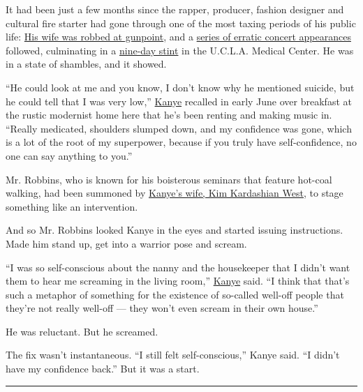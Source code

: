 It had been just a few months since the rapper, producer, fashion
designer and cultural fire starter had gone through one of the most
taxing periods of his public life:
\href{https://www.nytimes3xbfgragh.onion/2016/10/04/world/europe/kim-kardashian-robbed.html}{His
wife was robbed at gunpoint}, and a
\href{https://www.nytimes3xbfgragh.onion/2016/11/21/arts/music/kanye-west-beyonce-donald-trump-speech.html}{series
of erratic concert appearances} followed, culminating in a
\href{https://www.nytimes3xbfgragh.onion/2016/11/21/arts/music/kanye-west-hospitalized-exhaustion.html}{nine-day
stint} in the U.C.L.A. Medical Center. He was in a state of shambles,
and it showed.

``He could look at me and you know, I don't know why he mentioned
suicide, but he could tell that I was very low,''
\href{https://www.nytimes3xbfgragh.onion/2019/11/25/arts/music/kanye-west-nebuchadnezzar-opera.html}{Kanye}
recalled in early June over breakfast at the rustic modernist home here
that he's been renting and making music in. ``Really medicated,
shoulders slumped down, and my confidence was gone, which is a lot of
the root of my superpower, because if you truly have self-confidence, no
one can say anything to you.''

Mr. Robbins, who is known for his boisterous seminars that feature
hot-coal walking, had been summoned by
\href{https://www.nytimes3xbfgragh.onion/2019/11/25/arts/music/kanye-west-nebuchadnezzar-opera.html}{Kanye's
wife, Kim Kardashian West}, to stage something like an intervention.

And so Mr. Robbins looked Kanye in the eyes and started issuing
instructions. Made him stand up, get into a warrior pose and scream.

``I was so self-conscious about the nanny and the housekeeper that I
didn't want them to hear me screaming in the living room,''
\href{https://www.nytimes3xbfgragh.onion/2019/11/25/arts/music/kanye-west-nebuchadnezzar-opera.html}{Kanye}
said. ``I think that that's such a metaphor of something for the
existence of so-called well-off people that they're not really well-off
--- they won't even scream in their own house.''

He was reluctant. But he screamed.

The fix wasn't instantaneous. ``I still felt self-conscious,'' Kanye
said. ``I didn't have my confidence back.'' But it was a start.

\begin{center}\rule{0.5\linewidth}{\linethickness}\end{center}

